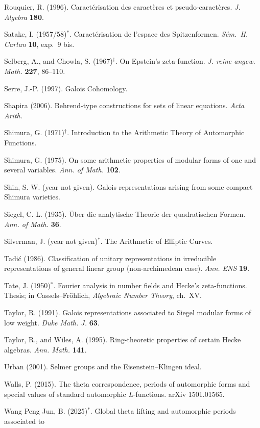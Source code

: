 \begin{list}{}{\setlength{\leftmargin}{1.5em}\setlength{\itemindent}{-1.5em}\setlength{\itemsep}{2pt}\setlength{\parsep}{0pt}}
\item Rouquier, R. (1996). Caract\'erisation des caract\`eres et pseudo-caract\`eres. \emph{J.
  Algebra} \textbf{180}.
\item Satake, I. (1957/58)$^*$. Caract\'erisation de l'espace des Spitzenformen. \emph{S\'em.\ H.
  Cartan} \textbf{10}, exp.~9 bis.
\item Selberg, A., and Chowla, S. (1967)$^\dagger$. On Epstein's zeta-function. \emph{J. reine angew.
  Math.} \textbf{227}, 86--110.
\item Serre, J.-P. (1997). Galois Cohomology.
\item Shapira (2006). Behrend-type constructions for sets of linear equations. \emph{Acta Arith.}
\item Shimura, G. (1971)$^\dagger$. Introduction to the Arithmetic Theory of Automorphic Functions.
\item Shimura, G. (1975). On some arithmetic properties of modular forms of one and several
  variables. \emph{Ann. of Math.} \textbf{102}.
\item Shin, S. W. (year not given). Galois representations arising from some compact Shimura
  varieties.
\item Siegel, C. L. (1935). \"Uber die analytische Theorie der quadratischen Formen. \emph{Ann. of
  Math.} \textbf{36}.
\item Silverman, J. (year not given)$^*$. The Arithmetic of Elliptic Curves.
\item Tadi\'c (1986). Classification of unitary representations in irreducible representations of
  general linear group (non-archimedean case). \emph{Ann. ENS} \textbf{19}.
\item Tate, J. (1950)$^*$. Fourier analysis in number fields and Hecke's zeta-functions. Thesis; in
  Cassels--Fr\"ohlich, \emph{Algebraic Number Theory}, ch.~XV.
\item Taylor, R. (1991). Galois representations associated to Siegel modular forms of low weight.
  \emph{Duke Math. J.} \textbf{63}.
\item Taylor, R., and Wiles, A. (1995). Ring-theoretic properties of certain Hecke algebras.
  \emph{Ann. Math.} \textbf{141}.
\item Urban (2001). Selmer groups and the Eisenstein--Klingen ideal.
\item Walls, P. (2015). The theta correspondence, periods of automorphic forms and special values of
  standard automorphic $L$-functions. arXiv 1501.01565.
\item Wang Peng Jun, B. (2025)$^*$. Global theta lifting and automorphic periods associated to

\end{list}
